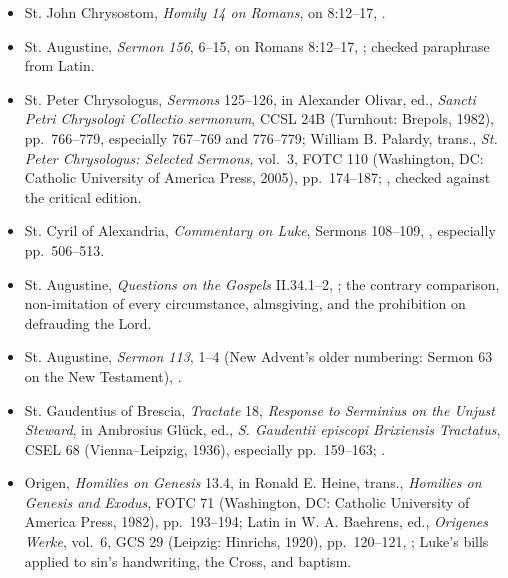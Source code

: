 \begin{deepstudy}
{\begin{itemize}[itemsep=0em,topsep=0.15em,parsep=0pt]
\item St. John Chrysostom, \emph{Homily 14 on Romans}, on 8:12--17, .
\item St. Augustine, \emph{Sermon 156}, 6--15, on Romans 8:12--17, ; checked paraphrase from Latin.
\item St. Peter Chrysologus, \emph{Sermons} 125--126, in Alexander Olivar, ed., \emph{Sancti Petri Chrysologi Collectio sermonum}, CCSL 24B (Turnhout: Brepols, 1982), pp.~766--779, especially 767--769 and 776--779; William B. Palardy, trans., \emph{St. Peter Chrysologus: Selected Sermons}, vol.~3, FOTC 110 (Washington, DC: Catholic University of America Press, 2005), pp.~174--187; , checked against the critical edition.
\item St. Cyril of Alexandria, \emph{Commentary on Luke}, Sermons 108--109, , especially pp.~506--513.
\item St. Augustine, \emph{Questions on the Gospels} II.34.1--2, ; the contrary comparison, non-imitation of every circumstance, almsgiving, and the prohibition on defrauding the Lord.
\item St. Augustine, \emph{Sermon 113}, 1--4 (New Advent's older numbering: Sermon 63 on the New Testament), .
\item St. Gaudentius of Brescia, \emph{Tractate} 18, \emph{Response to Serminius on the Unjust Steward}, in Ambrosius Gl\"uck, ed., \emph{S. Gaudentii episcopi Brixiensis Tractatus}, CSEL 68 (Vienna--Leipzig, 1936), especially pp.~159--163; .
\item Origen, \emph{Homilies on Genesis} 13.4, in Ronald E. Heine, trans., \emph{Homilies on Genesis and Exodus}, FOTC 71 (Washington, DC: Catholic University of America Press, 1982), pp.~193--194; Latin in W. A. Baehrens, ed., \emph{Origenes Werke}, vol.~6, GCS 29 (Leipzig: Hinrichs, 1920), pp.~120--121, ; Luke's bills applied to sin's handwriting, the Cross, and baptism.

\end{itemize}}
\end{deepstudy}
